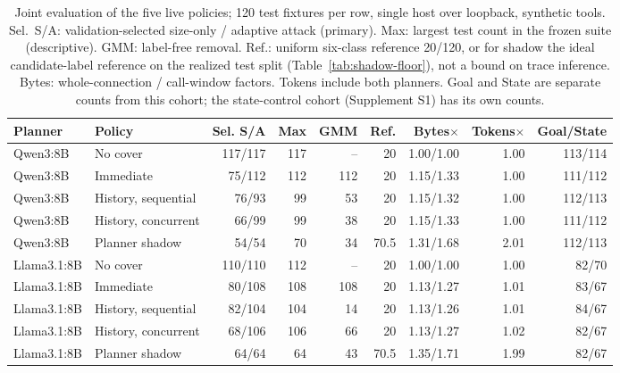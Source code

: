 \begin{table}[t]\centering\small
\caption{Joint evaluation of the five live policies; 120 test fixtures per row, single host over loopback, synthetic tools. Sel.\ S/A: validation-selected size-only / adaptive attack (primary). Max: largest test count in the frozen suite (descriptive). GMM: label-free removal. Ref.: uniform six-class reference 20/120, or for shadow the ideal candidate-label reference on the realized test split (Table~\ref{tab:shadow-floor}), not a bound on trace inference. Bytes: whole-connection / call-window factors. Tokens include both planners. Goal and State are separate counts from this cohort; the state-control cohort (Supplement S1) has its own counts.}\label{tab:live-timing-main}
\setlength{\tabcolsep}{4pt}
\begin{tabularx}{\textwidth}{@{}lYrrrrrrr@{}}\toprule
Planner & Policy & Sel. S/A & Max & GMM & Ref. & Bytes$\times$ & Tokens$\times$ & Goal/State \\\midrule

Qwen3:8B & No cover & 117/117 & 117 & -- & 20 & 1.00/1.00 & 1.00 & 113/114 \\
Qwen3:8B & Immediate & 75/112 & 112 & 112 & 20 & 1.15/1.33 & 1.00 & 111/112 \\
Qwen3:8B & History, sequential & 76/93 & 99 & 53 & 20 & 1.15/1.32 & 1.00 & 112/113 \\
Qwen3:8B & History, concurrent & 66/99 & 99 & 38 & 20 & 1.15/1.33 & 1.00 & 111/112 \\
Qwen3:8B & Planner shadow & 54/54 & 70 & 34 & 70.5 & 1.31/1.68 & 2.01 & 112/113 \\
Llama3.1:8B & No cover & 110/110 & 112 & -- & 20 & 1.00/1.00 & 1.00 & 82/70 \\
Llama3.1:8B & Immediate & 80/108 & 108 & 108 & 20 & 1.13/1.27 & 1.01 & 83/67 \\
Llama3.1:8B & History, sequential & 82/104 & 104 & 14 & 20 & 1.13/1.26 & 1.01 & 84/67 \\
Llama3.1:8B & History, concurrent & 68/106 & 106 & 66 & 20 & 1.13/1.27 & 1.02 & 82/67 \\
Llama3.1:8B & Planner shadow & 64/64 & 64 & 43 & 70.5 & 1.35/1.71 & 1.99 & 82/67 \\
\bottomrule\end{tabularx}\end{table}
